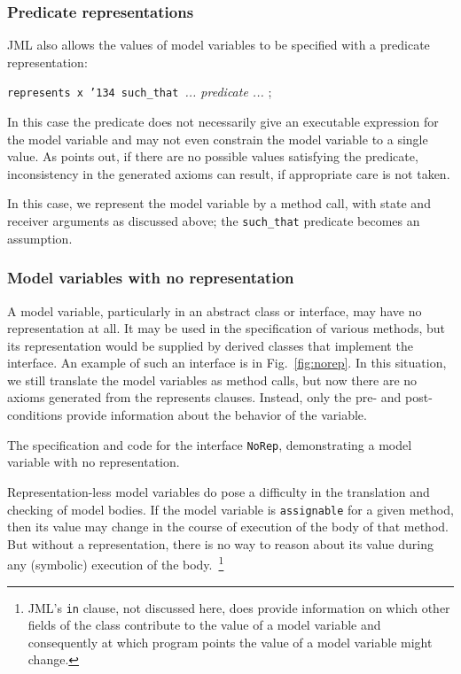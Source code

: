 \documentclass{sig-alternate}
\begin{document}
\subsubsection{Predicate representations}

JML also allows the values of model variables to be specified with a predicate representation:
\begin{center} \texttt{represents x \char'134 such\_that }{\em ... predicate ... } ; \end{center}
In this case the predicate does not necessarily give an executable expression for the
model variable and may not even constrain the model variable to a single value.  As
\cite{BreunessePoll03} points out, if there are no possible values satisfying the predicate, 
inconsistency in the generated axioms can result, if appropriate care is not taken.

In this case, we represent the model variable by a method call, with state and receiver arguments
as discussed above; the \texttt{such\_that} predicate becomes an assumption.

\subsubsection{Model variables with no representation}

A model variable, particularly in an abstract class or interface, may have no representation
at all.  It may be used in the specification of various methods, but its representation would be
supplied by derived classes that implement the interface.  An example of such an interface is
in Fig.~\ref{fig:norep}.  In this situation, we still translate the model variables as method calls,
but now there are no axioms generated from the represents clauses.  Instead, only the
pre- and post-conditions provide information about the behavior of the variable.

\begin{BFIGURE}

\caption{The specification and code for the interface \texttt{NoRep},
demonstrating a model variable with no representation.}
\label{fig:norep}
\end{BFIGURE}

Representation-less model variables do pose a difficulty in the translation and checking of model bodies.  If the model variable is \texttt{assignable} for a given method, then its value may 
change in the course of execution of the body of that method.  But without a representation,
there is no way to reason about its value during any (symbolic) execution of the 
body.~\footnote{JML's  \texttt{in} clause, not discussed here, does provide information
on which other fields of the class contribute to the value of a model variable and consequently
at which program points the value of a model variable might change.}
\end{document}
